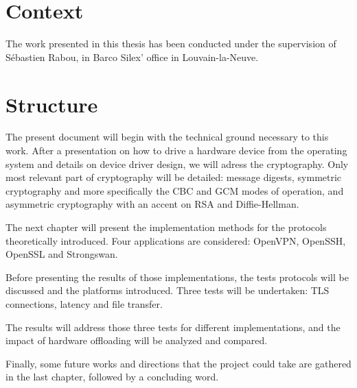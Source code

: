 \section{Context}
The work presented in this thesis has been conducted under the supervision of Sébastien Rabou, in Barco Silex' office in Louvain-la-Neuve.





\section{Structure}
The present document will begin with the technical ground necessary to this work.
After a presentation on how to drive a hardware device from the operating system and details on device driver design, we will adress the cryptography.
Only most relevant part of cryptography will be detailed: message digests, symmetric cryptography and more specifically the CBC and GCM modes of operation, and asymmetric cryptography with an accent on RSA and Diffie-Hellman.

The next chapter will present the implementation methods for the protocols theoretically introduced.
Four applications are considered: OpenVPN, OpenSSH, OpenSSL and Strongswan.

Before presenting the results of those implementations, the tests protocols will be discussed and the platforms introduced.
Three tests will be undertaken: TLS connections, latency and file transfer.

The results will address those three tests for different implementations, and the impact of hardware offloading will be analyzed and compared.

Finally, some future works and directions that the project could take are gathered in the last chapter, followed by a concluding word.